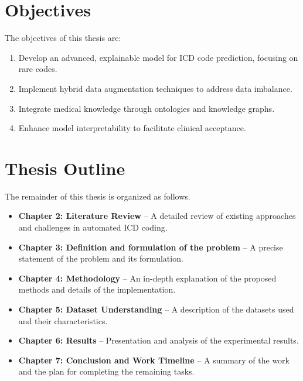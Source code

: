\section{Objectives}
The objectives of this thesis are:
\begin{enumerate}
    \item Develop an advanced, explainable model for ICD code prediction, focusing on rare codes.
    \item Implement hybrid data augmentation techniques to address data imbalance.
    \item Integrate medical knowledge through ontologies and knowledge graphs.
    \item Enhance model interpretability to facilitate clinical acceptance.
\end{enumerate}

\section{Thesis Outline}
The remainder of this thesis is organized as follows.
\begin{itemize}
    \item \textbf{Chapter 2: Literature Review} – A detailed review of existing approaches and challenges in automated ICD coding.
    \item \textbf{Chapter 3: Definition and formulation of the problem} – A precise statement of the problem and its formulation.
    \item \textbf{Chapter 4: Methodology} – An in-depth explanation of the proposed methods and details of the implementation.
    \item \textbf{Chapter 5: Dataset Understanding} – A description of the datasets used and their characteristics.
    \item \textbf{Chapter 6: Results} – Presentation and analysis of the experimental results.
    \item \textbf{Chapter 7: Conclusion and Work Timeline} – A summary of the work and the plan for completing the remaining tasks.
\end{itemize}

